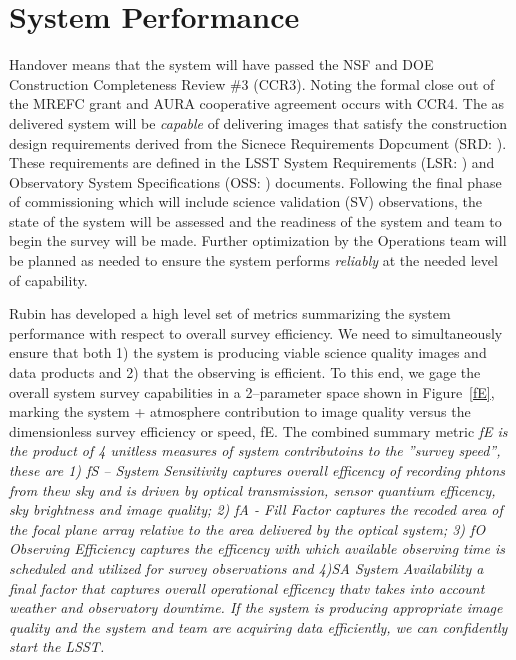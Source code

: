 \section{System Performance}{\label{secSysperf}}
  
Handover means that the system will have passed the NSF and DOE Construction Completeness Review \#3 (CCR3).  Noting the formal close out of the MREFC grant and AURA cooperative agreement occurs with CCR4. The as delivered system will be {\it capable} of delivering images that satisfy the construction design requirements derived from the Sicnece Requirements Dopcument (SRD: \cite{LPM-17}).  These requirements are defined in the LSST System Requirements (LSR: \cite{LSE-29)}) and Observatory System Specifications (OSS: \cite{LSE-30}) documents. Following the final phase of commissioning which will include science validation (SV) observations, the state of the system will be assessed and the readiness of the system and team to begin the survey will be made. Further optimization by the Operations team will be planned as needed to ensure the system performs {\it reliably} at the needed level of capability. 

Rubin has developed a high level set of metrics summarizing the system performance with respect to overall survey efficiency. We need to simultaneously ensure that both 1) the system is producing viable science quality images and data products and 2) that the observing is efficient.  To this end, we gage the overall system survey capabilities in a 2--parameter space shown  in Figure~\ref{fE}, marking the system + atmosphere contribution to image quality versus the dimensionless survey efficiency or speed, fE.  The combined summary metric \it{fE} is the product of 4 unitless measures of system contributoins to the ''survey speed'', these are 1)  \it{fS -- System Sensitivity} captures overall efficency of recording phtons from thew sky and is driven by optical transmission, sensor quantium efficency, sky brightness and image quality; 2) \it{fA - Fill Factor} captures the recoded area of the focal plane array relative to the area delivered by the optical system; 3) \it{fO Observing Efficiency} captures the efficency with which available observing time is scheduled and utilized for survey observations and 4)\it{SA System Availability} a final factor that captures overall operational efficency thatv takes into account weather and observatory downtime.   If the system is producing appropriate image quality and the system and team are acquiring data efficiently, we can confidently start the LSST.  

